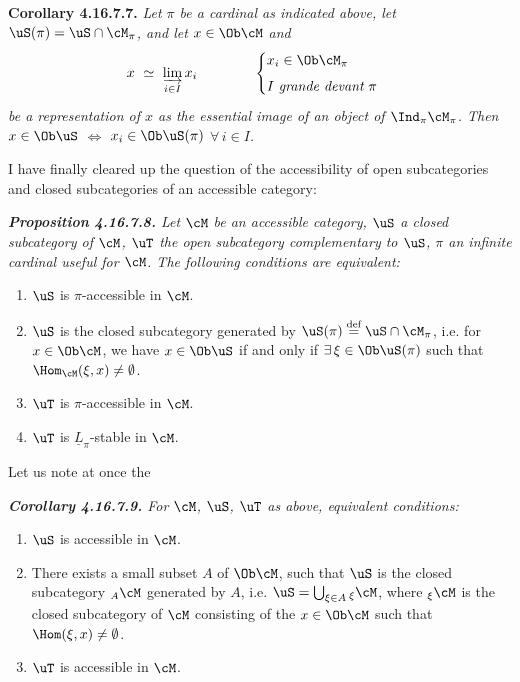 \textbf{Corollary 4.16.7.7.} \textit{Let $\pi$ be a cardinal as indicated above, let $\uS(\pi) = \uS \cap \cM_\pi$, and let $x \in \Ob \cM$ and
\[
x \ \simeq\ \varinjlim_{i\in I} x_i \qquad\qquad
\begin{cases}
x_i \in \Ob \cM_\pi \\[1ex]
I \ \textit{grande devant}\ \pi
\end{cases}
\]
be a representation of $x$ as the essential image of an object of $\Ind_\pi \cM_\pi$. Then $x \in \Ob \uS$ $\Longleftrightarrow$ $x_i \in \Ob \uS(\pi)$ $\forall\, i \in I$.}

I have finally cleared up the question of the accessibility of open subcategories and closed subcategories of an accessible category:

\begingroup\itshape
\noindent\textbf{\upshape Proposition 4.16.7.8.} Let $\cM$ be an accessible category, $\uS$ a closed subcategory of $\cM$, $\uT$ the open subcategory complementary to $\uS$, $\pi$ an infinite cardinal useful for $\cM$. The following conditions are equivalent:
\begin{enumerate}[label={}]
\item[a)] $\uS$ is $\pi$-accessible in $\cM$.
\item[a$'$)] $\uS$ is the closed subcategory generated by $\uS(\pi) \overset{\text{\upshape def}}{=} \uS \cap \cM_\pi$, i.e. for $x \in \Ob \cM$, we have $x \in \Ob \uS$ if and only if $\exists\, \xi \in \Ob \uS(\pi)$ such that $\Hom_{\cM}(\xi, x) \neq \emptyset$.
\item[b)] $\uT$ is $\pi$-accessible in $\cM$.
\item[b$'$)] $\uT$ is $\underline{L}_\pi$-stable in $\cM$.
\end{enumerate}
\endgroup

\noindent Let us note at once the

\begingroup\itshape
\noindent\textbf{\upshape Corollary 4.16.7.9.} For $\cM$, $\uS$, $\uT$ as above, equivalent conditions:
\begin{enumerate}[label={}]
\item[a)] $\uS$ is accessible in $\cM$.
\item[a$'$)] There exists a \textup{small} subset $A$ of $\Ob \cM$, such that $\uS$ is the closed subcategory ${}_A\cM$ generated by $A$, i.e. $\uS = \bigcup_{\xi\in A} {}_\xi\cM$, where ${}_\xi\cM$ is the closed subcategory of $\cM$ consisting of the $x \in \Ob \cM$ such that $\Hom(\xi, x) \neq \emptyset$.
\item[b)] $\uT$ is accessible in $\cM$.
\end{enumerate}
\endgroup